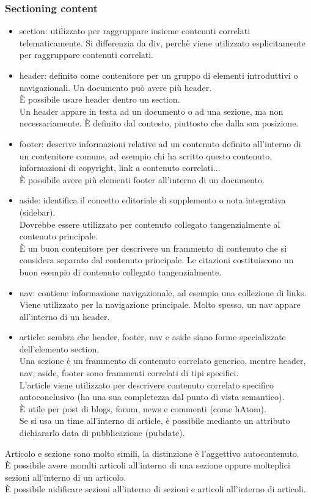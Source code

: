 \documentclass{article}
\begin{document}
\subsubsection{Sectioning content}
\begin{itemize}
	\item section: utilizzato per raggruppare insieme contenuti correlati telematicamente. Si differenzia da div, perchè viene utilizzato esplicitamente per raggruppare contenuti correlati.
	\item header: definito come contenitore per un gruppo di elementi introduttivi o navigazionali. Un documento può avere più header.\\ È possibile usare header dentro un section.\\
	Un header appare in testa ad un documento o ad una sezione, ma non necessariamente. È definito dal contesto, piuttosto che dalla sua posizione.
	\item footer: descrive informazioni relative ad un contenuto definito all'interno di un contenitore comune, ad esempio chi ha scritto questo contenuto, informazioni di copyright, link a contenuto correlati...\\
	È possibile avere più elementi footer all'interno di un documento.
	\item aside: identifica il concetto editoriale di supplemento o nota integrativa (sidebar).\\
	Dovrebbe essere utilizzato per contenuto collegato tangenzialmente al contenuto principale.\\
	È un buon contenitore per descrivere un frammento di contenuto che si considera separato dal contenuto principale. Le citazioni costituiscono un buon esempio di contenuto collegato tangenzialmente.
	\item nav: contiene informazione navigazionale, ad esempio una collezione di links.
	Viene utilizzato per la navigazione principale. Molto spesso, un nav appare all'interno di un header.
	\item article: sembra che header, footer, nav e aside siano forme specializzate dell'elemento section.\\
	Una sezione è un frammento di contenuto correlato generico, mentre header, nav, aside, footer sono frammenti correlati di tipi specifici.\\
	L'article viene utilizzato per descrivere contenuto correlato specifico autoconclusivo (ha una sua completezza dal punto di vista semantico).\\
	È utile per post di blogs, forum, news e commenti (come hAtom).\\
	Se si usa un time all'interno di article, è possibile mediante un attributo dichiararlo data di pubblicazione (pubdate).
\end{itemize}
Articolo e sezione sono molto simili, la distinzione è l'aggettivo autocontenuto. \\
È possibile avere momlti articoli all'interno di una sezione oppure molteplici sezioni all'interno di un articolo.\\
È possibile nidificare sezioni all'interno di sezioni e articoli all'interno di articoli.
\end{document}
